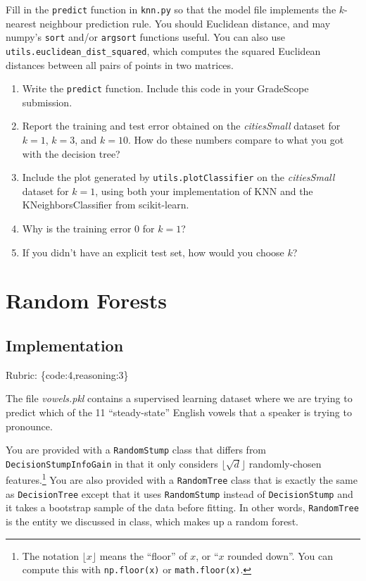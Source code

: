 \documentclass{article}
\def\rubric#1{\gre{Rubric: \{#1\}}}{}
\def\blu#1{{\color{blu}#1}}
\def\gre#1{{\color{gre}#1}}
\def\enum#1{\begin{enumerate}#1\end{enumerate}}
\begin{document}
Fill in the \texttt{predict} function in \texttt{knn.py} so that the model file implements the $k$-nearest neighbour prediction rule.
You should Euclidean distance, and may numpy's \texttt{sort} and/or \texttt{argsort} functions useful.
You can also use \texttt{utils.euclidean\string_dist\string_squared}, which computes the squared Euclidean distances between all pairs of points in two matrices.
\blu{
\enum{
\item Write the \texttt{predict} function. Include this code in your GradeScope submission.
\item Report  the training and test error obtained on the \emph{citiesSmall} dataset for $k=1$, $k=3$, and $k=10$. How do these numbers compare to what you got with the decision tree?
\item Include the plot generated by \texttt{utils.plotClassifier} on the \emph{citiesSmall} dataset for $k=1$, using both your implementation of KNN and the KNeighborsClassifier from scikit-learn.
\item Why is the training error $0$ for $k=1$?
\item If you didn't have an explicit test set, how would you choose $k$?
}}


\section{Random Forests}

\subsection{Implementation}
\rubric{code:4,reasoning:3}

The file \emph{vowels.pkl} contains a supervised learning dataset where we are trying to predict which of the 11 ``steady-state'' English vowels that a speaker is trying to pronounce.

You are provided with a \texttt{RandomStump} class that differs from
\texttt{DecisionStumpInfoGain} in that
it only considers $\lfloor \sqrt{d} \rfloor$ randomly-chosen features.\footnote{The notation $\lfloor x\rfloor$ means the ``floor'' of $x$, or ``$x$ rounded down''. You can compute this with \texttt{np.floor(x)} or \texttt{math.floor(x)}.}
You are also provided with a \texttt{RandomTree} class that is exactly the same as
\texttt{DecisionTree} except that it uses \texttt{RandomStump} instead of
\texttt{DecisionStump} and it takes a bootstrap sample of the data before fitting.
In other words, \texttt{RandomTree} is the entity we discussed in class, which
makes up a random forest.
\end{document}
